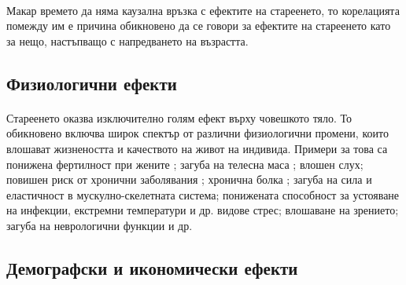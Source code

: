 \documentclass[pdftex,cyrillic,14pt,a4page,twoside]{extreport}
\begin{document}
\paragraph{}
Макар времето да няма каузална връзка с ефектите на стареенето, то корелацията помежду им е причина обикновено да се говори за ефектите на стареенето като за нещо, настъпващо с напредването на възрастта.

\subsection{Физиологични ефекти}
\paragraph{}
Стареенето оказва изключително голям ефект върху човешкото тяло. То обикновено включва широк спектър от различни физиологични промени, които влошават жизнеността и качеството на живот на индивида. Примери за това са понижена фертилност при жените \cite{kamath2010}; загуба на телесна маса \cite{spencer1996}; влошен слух\cite{feder2015}; повишен риск от хронични заболявания \cite{larson2013}\cite{prasad2012}; хронична болка \cite{geriatrics2002}; загуба на сила и еластичност в мускулно-скелетната система; понижената способност за устояване на инфекции, екстремни температури и др. видове стрес; влошаване на зрението; загуба на неврологични функции \cite{vina2007} и др.


\subsection{Демографски и икономически ефекти}
\end{document}
